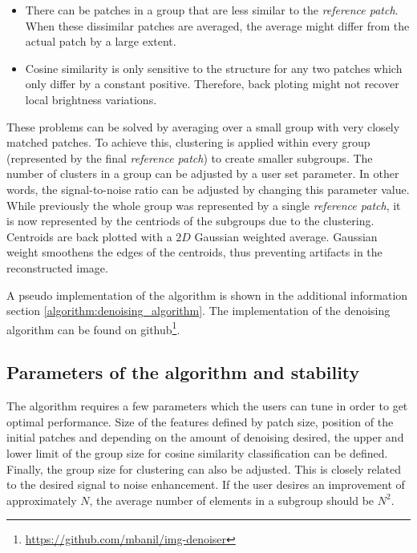 \documentclass[fleqn,10pt]{wlscirep}
\begin{document}
	\begin{itemize}
		\item There can be patches in a group that are less similar to the \textit{reference patch}. When these dissimilar patches are averaged, the average might differ from the actual patch by a large extent. 
		\item Cosine similarity is only sensitive to the structure for any two patches which only differ by a constant positive. Therefore, back ploting might not recover local brightness variations.
	\end{itemize}
	
	These problems can be solved by averaging over a small group with very closely matched patches. To achieve this, clustering is applied within every group (represented by the final \textit{reference patch}) to create smaller subgroups. The number of clusters in a group can be adjusted by a user set parameter. In other words, the signal-to-noise ratio can be adjusted by changing this parameter value. While previously the whole group was represented by a single \textit{reference patch}, it is now represented by the centriods of the subgroups due to the clustering. Centroids are back plotted with a $2D$ Gaussian weighted average. Gaussian weight smoothens the edges of the centroids, thus preventing artifacts in the reconstructed image. 
	
	A pseudo implementation of the algorithm is shown in the additional information section \ref{algorithm:denoising_algorithm}. The implementation of the denoising algorithm can be found on github\footnote{\url{https://github.com/mbanil/img-denoiser}}.
	
	\subsection*{Parameters of the algorithm and stability}
	
	The algorithm requires a few parameters which the users can tune in order to get optimal performance. Size of the features defined by patch size, position of the initial patches and depending on the amount of denoising desired, the upper and lower limit of the group size for cosine similarity classification can be defined. Finally, the group size for clustering can also be adjusted. This is closely related to the desired signal to noise enhancement. If the user desires an improvement of approximately $N$, the average number of elements in a subgroup should be $N^2$.
	
	
	
\end{document}
